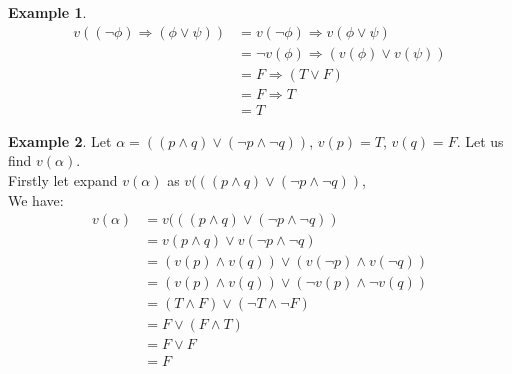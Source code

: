 \documentclass[11pt]{article}
\theoremstyle{definition}
\newtheorem{eg}{Example}
\begin{document}
\begin{eg}
    \begin{equation}
        \begin{split}
             v((\neg \phi) \Rightarrow (\phi \vee \psi)) &= v(\neg \phi) \Rightarrow v(\phi \vee \psi)\\
                                                           &= \neg v(\phi) \Rightarrow (v(\phi) \vee v(\psi))\\
                                                           &= F \Rightarrow (T \vee F)\\
                                                           &= F \Rightarrow T\\
                                                           &= T
        \end{split}
    \end{equation}    
\end{eg}

\begin{eg}
    Let $\alpha = ((p \wedge q) \vee (\neg p \wedge \neg q))$, $v(p)=T$, $v(q)=F$. Let us find $v(\alpha)$.\\
    Firstly let expand $v(\alpha)$ as $v(((p \wedge q) \vee (\neg p \wedge \neg q))$,\\
    We have:
    \begin{equation}
        \begin{split}
            v(\alpha)&= v(((p \wedge q) \vee (\neg p \wedge \neg q)) \\
                     &= v(p \wedge q) \vee v(\neg p \wedge \neg q)\\
                     &= (v(p) \wedge v(q)) \vee (v(\neg p) \wedge v(\neg q))\\
                     &= (v(p) \wedge v(q)) \vee (\neg v(p) \wedge \neg v(q))\\
                     &= (T \wedge F) \vee (\neg T \wedge \neg F)\\
                     &= F \vee (F \wedge T)\\
                     &= F \vee F\\
                     &= F
        \end{split}
    \end{equation}
\end{eg}
\end{document}
